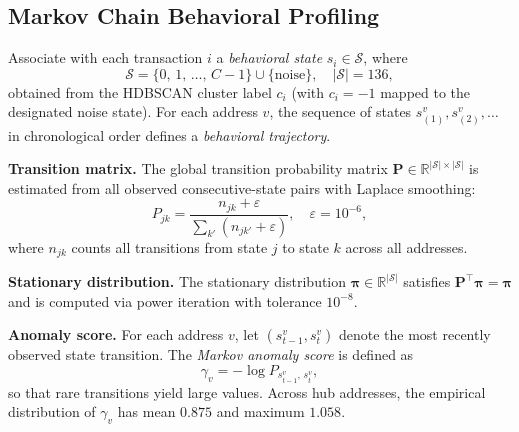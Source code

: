 \subsection{Markov Chain Behavioral Profiling}
\label{subsec:markov}

\begin{definition}
\label{def:markov}
Associate with each transaction $i$ a \emph{behavioral state}
$s_{i}\in\mathcal{S}$, where
\begin{equation}
  \mathcal{S}
    = \{0,\,1,\,\ldots,\,C-1\} \cup \{\text{noise}\},
  \quad |\mathcal{S}| = 136,
  \label{eq:statespace}
\end{equation}
obtained from the HDBSCAN cluster label $c_{i}$ (with $c_{i}=-1$ mapped
to the designated noise state).
For each address $v$, the sequence of states
$s_{(1)}^{v}, s_{(2)}^{v}, \ldots$ in chronological order defines a
\emph{behavioral trajectory}.
\end{definition}

\noindent\textbf{Transition matrix.}
The global transition probability matrix
$\mathbf{P}\in\mathbb{R}^{|\mathcal{S}|\times|\mathcal{S}|}$
is estimated from all observed consecutive-state pairs with Laplace smoothing:
\begin{equation}
  P_{jk}
    = \frac{n_{jk} + \varepsilon}{\displaystyle\sum_{k'} (n_{jk'} + \varepsilon)},
  \quad \varepsilon = 10^{-6},
  \label{eq:transition}
\end{equation}
where $n_{jk}$ counts all transitions from state $j$ to state $k$ across all
addresses.

\noindent\textbf{Stationary distribution.}
The stationary distribution $\boldsymbol{\pi}\in\mathbb{R}^{|\mathcal{S}|}$
satisfies $\mathbf{P}^{\!\top}\boldsymbol{\pi} = \boldsymbol{\pi}$ and is
computed via power iteration with tolerance $10^{-8}$.

\noindent\textbf{Anomaly score.}
For each address $v$, let $(s_{t-1}^{v}, s_{t}^{v})$ denote the most recently
observed state transition.  The \emph{Markov anomaly score} is defined as
\begin{equation}
  \gamma_{v}
    = -\log P_{s_{t-1}^{v},\,s_{t}^{v}},
  \label{eq:markov_score}
\end{equation}
so that rare transitions yield large values.
Across hub addresses, the empirical distribution of $\gamma_{v}$ has mean
$0.875$ and maximum $1.058$.

